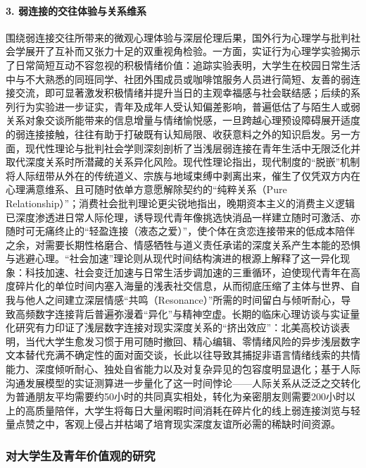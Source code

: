\paragraph{3. 弱连接的交往体验与关系维系}
围绕弱连接交往所带来的微观心理体验与深层伦理后果，国外行为心理学与批判社会学展开了互补而又张力十足的双重视角检验。一方面，实证行为心理学实验揭示了日常简短互动不容忽视的积极情绪价值：追踪实验表明，大学生在校园日常生活中与不大熟悉的同班同学、社团外围成员或咖啡馆服务人员进行简短、友善的弱连接交流，即可显著激发积极情绪并提升当日的主观幸福感与社会联结感\cite{Sandstrom2014}；后续的系列行为实验进一步证实，青年及成年人受认知偏差影响，普遍低估了与陌生人或弱关系对象交谈所能带来的信息增量与情绪愉悦感，一旦跨越心理预设障碍展开适度的弱连接接触，往往有助于打破既有认知局限、收获意料之外的知识启发\cite{doi:10.1073/pnas.2206992119}。另一方面，现代性理论与批判社会学则深刻剖析了当浅层弱连接在青年生活中无限泛化并取代深度关系时所潜藏的关系异化风险。现代性理论指出，现代制度的“脱嵌”机制将人际纽带从外在的传统道义、宗族与地域束缚中剥离出来，催生了仅凭双方内在心理满意维系、且可随时依单方意愿解除契约的“纯粹关系（Pure Relationship）”\cite{Giddens1998}；消费社会批判理论更尖锐地指出，晚期资本主义的消费主义逻辑已深度渗透进日常人际伦理，诱导现代青年像挑选快消品一样建立随时可激活、亦随时可无痛终止的“轻盈连接（液态之爱）”，使个体在贪恋连接带来的低成本陪伴之余，对需要长期性格磨合、情感牺牲与道义责任承诺的深度关系产生本能的恐惧与逃避心理\cite{Bauman2003}。“社会加速”理论则从现代时间结构演进的根源上解释了这一异化现象：科技加速、社会变迁加速与日常生活步调加速的三重循环，迫使现代青年在高度碎片化的单位时间内塞入海量的浅表社交信息，从而彻底压缩了主体与世界、自我与他人之间建立深层情感“共鸣（Resonance）”所需的时间留白与倾听耐心，导致高频数字连接背后普遍弥漫着“异化”与精神空虚\cite{Rosa2015}。长期的临床心理访谈与实证量化研究有力印证了浅层数字连接对现实深度关系的“挤出效应”：北美高校访谈表明，当代大学生愈发习惯于用可随时撤回、精心编辑、零情绪风险的异步浅层数字文本替代充满不确定性的面对面交谈，长此以往导致其捕捉非语言情绪线索的共情能力、深度倾听耐心、独处自省能力以及对复杂异见的包容度明显退化\cite{Turkle2015}；基于人际沟通发展模型的实证测算进一步量化了这一时间悖论——人际关系从泛泛之交转化为普通朋友平均需要约50小时的共同真实相处，转化为亲密朋友则需要200小时以上的高质量陪伴，大学生将每日大量闲暇时间消耗在碎片化的线上弱连接浏览与轻量点赞之中，客观上侵占并枯竭了培育现实深度友谊所必需的稀缺时间资源\cite{Hall2019}。

\subsubsection{对大学生及青年价值观的研究}

